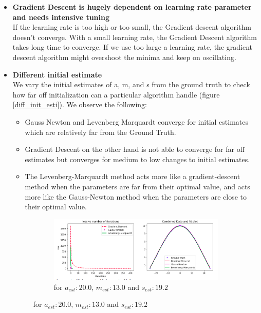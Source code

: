 \documentclass[journal]{IEEEtran}
\begin{document}
\begin{itemize}
\item \textbf{Gradient Descent is hugely dependent on learning rate parameter and needs intensive tuning}\\
If the learning rate is too high or too small, the Gradient descent algorithm doesn't converge.
With a small learning rate, the Gradient Descent algorithm takes long time to converge. If we use too large a learning rate, the gradient descent algorithm might overshoot the minima and keep on oscillating. 

\item \textbf{Different initial estimate}\\
We vary the initial estimates of a, m, and s from the ground truth to check how far off initialization can a particular algorithm handle (figure \ref{diff_init_esti}). We observe the following:
\begin{itemize}
    \item Gauss Newton and Levenberg Marquardt converge for initial estimates which are relatively far from the Ground Truth.
    \item Gradient Descent on the other hand is not able to converge for far off estimates but converges for medium to low changes to initial estimates. 
    \item The Levenberg-Marquardt method acts more like a gradient-descent method when the parameters are far from their optimal value, and acts more like the Gauss-Newton method when the parameters are close to their optimal value.
\end{itemize} 

\begin{figure}%
\centering
\begin{subfigure}[b]{0.5\textwidth}
\includegraphics[width=.9\linewidth]
{Figures/diff_init_esti}
\caption{ for $a_{est}: 20.0$,  $m_{est}: 13.0$ and  $s_{est}: 19.2$}
\end{subfigure}


\end{figure}
\end{itemize}
\end{document}
